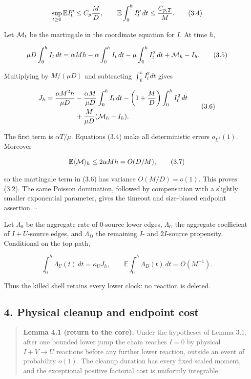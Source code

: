 \[
 \sup_{t\ge0}{\mathbb E}I_t^p\le C_p{M\over D},
 \qquad
 {\mathbb E}\int_0^h I_t^p\,dt\le {C_{p,T}\over M}.
\tag{3.4}
\]

Let \({\cal M}_t\) be the martingale in the coordinate equation for
\(I\). At time \(h\),

\[
 \mu D\int_0^h I_t\,dt
 =\alpha Mh-\alpha\int_0^h I_t\,dt
  -\mu\int_0^h I_t^2\,dt+{\cal M}_h-I_h.              \tag{3.5}
\]

Multiplying by \(M/(\mu D)\) and subtracting \(\int_0^h I_t^2dt\) gives

\[
\begin{split}
 J_h={\alpha M^2h\over\mu D}
 &-{\alpha M\over\mu D}\int_0^h I_t\,dt
  -\left(1+{M\over D}\right)\int_0^h I_t^2\,dt\\
 &+{M\over\mu D}({\cal M}_h-I_h).
\end{split}\tag{3.6}
\]

The first term is \(\alpha T/\mu\). Equations (3.4) make all
deterministic errors \(o_{L^1}(1)\). Moreover

\[
 {\mathbb E}\langle{\cal M}\rangle_h
 \le 2\alpha Mh=O(D/M),
\tag{3.7}
\]

so the martingale term in (3.6) has variance \(O(M/D)=o(1)\). This
proves (3.2). The same Poisson domination, followed by compensation with
a slightly smaller exponential parameter, gives the timeout and
size-biased endpoint assertion. \(\square\)

Let \(\Lambda_0\) be the aggregate rate of \(0\)-source lower edges,
\(\Lambda_U\) the aggregate coefficient of \(I+U\)-source edges, and
\(\Lambda_D\) the remaining \(I\)- and \(2I\)-source propensity.
Conditional on the top path,

\[
 \int_0^h\Lambda_U(t)\,dt=\kappa_UJ_h,\qquad
 {\mathbb E}\int_0^h\Lambda_D(t)\,dt=O(M^{-1}).
\tag{3.8}
\]

Thus the killed shell retains every lower clock: no reaction is deleted.

\subsection{4. Physical cleanup and endpoint
cost}

\begin{quote}
\textbf{Lemma 4.1 (return to the core).} Under the hypotheses of Lemma
3.1, after one bounded lower jump the chain reaches \(I=0\) by physical
\(I+V\to U\) reactions before any further lower reaction, outside an
event of probability \(o(1)\). The cleanup duration has every fixed
scaled moment, and the exceptional positive factorial cost is uniformly
integrable.
\end{quote}

